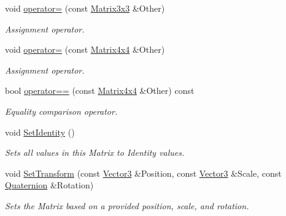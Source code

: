 \begin{DoxyCompactItemize}
void \hyperlink{classMezzanine_1_1Matrix4x4_af57f56486fbfcd46cd962506d31c4d55}{operator=} (const \hyperlink{classMezzanine_1_1Matrix3x3}{Matrix3x3} \&Other)
\begin{DoxyCompactList}\small\item\em Assignment operator. \item\end{DoxyCompactList}\item 
void \hyperlink{classMezzanine_1_1Matrix4x4_a0b4d95ea15826e4e07f257b3ab9c4c11}{operator=} (const \hyperlink{classMezzanine_1_1Matrix4x4}{Matrix4x4} \&Other)
\begin{DoxyCompactList}\small\item\em Assignment operator. \item\end{DoxyCompactList}\item 
bool \hyperlink{classMezzanine_1_1Matrix4x4_ae9930131974ed84a89dab482b8473d3c}{operator==} (const \hyperlink{classMezzanine_1_1Matrix4x4}{Matrix4x4} \&Other) const 
\begin{DoxyCompactList}\small\item\em Equality comparison operator. \item\end{DoxyCompactList}\item 
void \hyperlink{classMezzanine_1_1Matrix4x4_a98e92577c1990358b559675fd910744f}{SetIdentity} ()
\begin{DoxyCompactList}\small\item\em Sets all values in this Matrix to Identity values. \item\end{DoxyCompactList}\item 
void \hyperlink{classMezzanine_1_1Matrix4x4_a76a0cceae3c8cbc8ed8ff093794fcd67}{SetTransform} (const \hyperlink{classMezzanine_1_1Vector3}{Vector3} \&Position, const \hyperlink{classMezzanine_1_1Vector3}{Vector3} \&Scale, const \hyperlink{classMezzanine_1_1Quaternion}{Quaternion} \&Rotation)
\begin{DoxyCompactList}\small\item\em Sets the Matrix based on a provided position, scale, and rotation. \item\end{DoxyCompactList}\item 
\hypertarget{classMezzanine_1_1Matrix4x4_ad77e9326617838d731d3da66d8d2a9b8}{
}
\end{DoxyCompactItemize}
